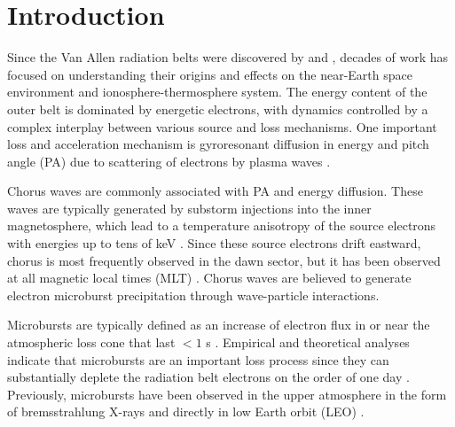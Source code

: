 %
%
\section{Introduction}\label{Intro} %
Since the Van Allen radiation belts were discovered by \citet{Allen1959} and \citet{Vernov1960}, decades of work has focused on understanding their origins and effects on the near-Earth space environment and ionosphere-thermosphere system. The energy content of the outer belt is dominated by energetic electrons, with dynamics controlled by a complex interplay between various source and loss mechanisms. One important loss and acceleration mechanism is gyroresonant diffusion in energy and pitch angle (PA) due to scattering of electrons by plasma waves \citep[e.g.][]{Thorne1980, Walker1993, Summers1998, Meredith2002, Horne2003, Thorne2005, Millan2007, Bortnik2008}.

Chorus waves are commonly associated with PA and energy diffusion. These waves are typically generated by substorm injections into the inner magnetosphere, which lead to a temperature anisotropy of the source electrons with energies up to tens of keV \citep[e.g.][]{Horne2003b, Li2009b}. Since these source electrons drift eastward, chorus is most frequently observed in the dawn sector, but it has been observed at all magnetic local times (MLT) \citep{Li2009}. Chorus waves are believed to generate electron microburst precipitation through wave-particle interactions.

Microbursts are typically defined as an increase of electron flux in or near the atmospheric loss cone that last $< 1$ s \citep[e.g.][]{Anderson1964, Blake1996, Lorentzen2001a}. Empirical and theoretical analyses indicate that microbursts are an important loss process since they can substantially deplete the radiation belt electrons on the order of one day \citep[e.g.][]{Lorentzen2001b, O'Brien2004, Thorne2005, Breneman2017}. Previously, microbursts have been observed in the upper atmosphere in the form of bremsstrahlung X-rays \citep[e.g.][]{Parks1967, Woodger2015, Anderson2017} and directly in low Earth orbit (LEO) \citep[e.g.][]{Nakamura1995, Nakamura2000, Blake1996, Lorentzen2001a, Lorentzen2001b, O'Brien2003, O'Brien2004, Lee2005, Lee2012, Blum2015, Crew2016, Breneman2017, Mozer2018}.
 
